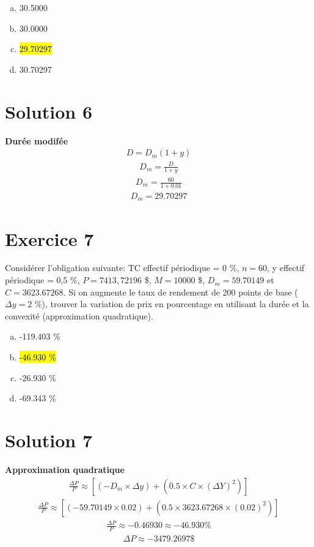 \documentclass[10pt,a4paper]{article}
\begin{document}
\begin{enumerate}[a)]
\item 30.5000
\item 30.0000
\item \hl{29.70297}
\item 30.70297 
\end{enumerate}

\section*{Solution 6}

\textbf{Durée modifée}
\begin{align*}
D=D_m(1+y)
\end{align*}
\begin{align*}
D_m=\frac{D}{1+y}
\end{align*}
\begin{align*}
D_m=\frac{60}{1+0.01}
\end{align*}
\begin{align*}
D_m=29.70297
\end{align*}

\newpage

\section*{Exercice 7}
Considérer l’obligation suivante: TC effectif périodique = 0 \%, $n = 60$, y effectif périodique = 0,5 \%, $P = 7413,72196$ \$, $M= 10000$ \$, $D_m = 59.70149$ et $C = 3623.67268$.  Si on augmente le taux de rendement de 200 points de base ($\Delta y = 2$  \%),  trouver la variation de prix en pourcentage en utilisant la durée et la convexité (approximation quadratique). 

\begin{enumerate}[a)]
\item -119.403 \%
\item \hl{-46.930 \%}
\item -26.930 \%
\item -69.343 \%
\end{enumerate}

\section*{Solution 7}
\textbf{Approximation quadratique}
\begin{align*}
\frac{\Delta P}{P} \approx \left[ (-D_m \times \Delta y)+(0.5 \times C \times (\Delta Y)^2) \right]
\end{align*}
\begin{align*}
\frac{\Delta P}{P} \approx \left[ (-59.70149 \times 0.02)+(0.5 \times 3623.67268 \times (0.02)^2) \right]
\end{align*}
\begin{align*}
\frac{\Delta P}{P} \approx -0.46930 \approx -46.930\%
\end{align*}
\begin{align*}
\Delta P \approx -3479.2697 \$
\end{align*}
\end{document}
